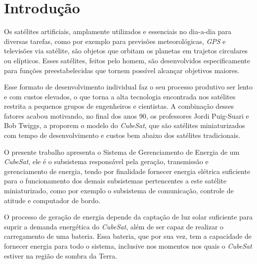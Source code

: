 \documentclass[
	12pt,				%
	openright,			%
	oneside,			%
	a4paper,			%
	english,			%
	french,				%
	spanish,			%
	brazil,				%
	oldfontcommands
	]{abntex2}
\begin{document}
\tableofcontents*
\cleardoublepage



\textual

\chapter[Introdução]{Introdução}

	Os satélites artificiais, amplamente utilizados e essenciais no dia-a-dia para diversas tarefas, como por exemplo para previsões meteorológicas, \textit{GPS} e televisões via satélite, são objetos que orbitam os planetas em trajetos circulares ou elípticos. Esses satélites, feitos pelo homem, são desenvolvidos especificamente para funções preestabelecidas que tornem possível alcançar objetivos maiores. 
	
	Esse formato de desenvolvimento individual faz o seu processo produtivo ser lento e com custos elevados, o que torna a alta tecnologia encontrada nos satélites restrita a pequenos grupos de engenheiros e cientistas. A combinação desses fatores acabou motivando, no final dos anos 90, os professores Jordi Puig-Suari e Bob Twiggs, a proporem o modelo do \textit{CubeSat}, que são satélites miniaturizados com tempo de desenvolvimento e custos bem abaixo dos satélites tradicionais.
	
	O presente trabalho apresenta o Sistema de Gerenciamento de Energia de um \textit{CubeSat}, ele é o subsistema responsável pela geração, transmissão e gerenciamento de energia, tendo por finalidade fornecer energia elétrica suficiente para o funcionamento dos demais subsistemas pertencentes a este satélite miniaturizado, como por exemplo o subsistema de comunicação, controle de atitude e computador de bordo.
	
	O processo de geração de energia depende da captação de luz solar suficiente para suprir a demanda energética do \textit{CubeSat}, além de ser capaz de realizar o carregamento de uma bateria. Essa bateria, que por sua vez, tem a capacidade de fornecer energia para todo o sistema, inclusive nos momentos nos quais o \textit{CubeSat} estiver na região de sombra da Terra.
	
\end{document}
